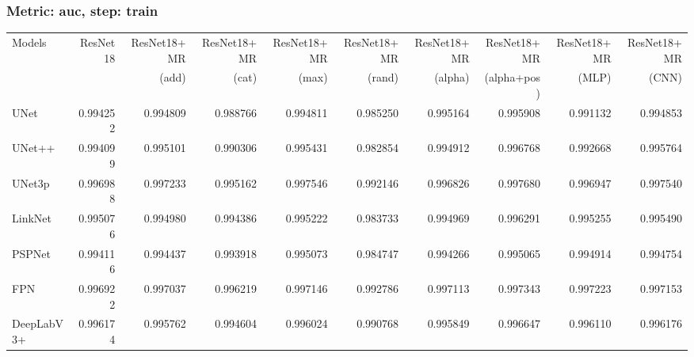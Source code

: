 \documentclass{article}
\begin{document}
\subsubsection{Metric: auc, step: train}
\begin{tabular}{lrrrrrrrrr}
\toprule
Models & ResNet18 & ResNet18+MR & ResNet18+MR & ResNet18+MR & ResNet18+MR & ResNet18+MR & ResNet18+MR & ResNet18+MR & ResNet18+MR \\
       &          &       (add) &       (cat) &       (max) &      (rand) &     (alpha) & (alpha+pos) &       (MLP) &       (CNN) \\
\midrule
UNet & 0.994252 & 0.994809 & 0.988766 & 0.994811 & 0.985250 & 0.995164 & 0.995908 & 0.991132 & 0.994853 \\
UNet++ & 0.994099 & 0.995101 & 0.990306 & 0.995431 & 0.982854 & 0.994912 & 0.996768 & 0.992668 & 0.995764 \\
UNet3p & 0.996988 & 0.997233 & 0.995162 & 0.997546 & 0.992146 & 0.996826 & 0.997680 & 0.996947 & 0.997540 \\
LinkNet & 0.995076 & 0.994980 & 0.994386 & 0.995222 & 0.983733 & 0.994969 & 0.996291 & 0.995255 & 0.995490 \\
PSPNet & 0.994116 & 0.994437 & 0.993918 & 0.995073 & 0.984747 & 0.994266 & 0.995065 & 0.994914 & 0.994754 \\
FPN & 0.996922 & 0.997037 & 0.996219 & 0.997146 & 0.992786 & 0.997113 & 0.997343 & 0.997223 & 0.997153 \\
DeepLabV3+ & 0.996174 & 0.995762 & 0.994604 & 0.996024 & 0.990768 & 0.995849 & 0.996647 & 0.996110 & 0.996176 \\
\bottomrule
\end{tabular}
\end{document}
